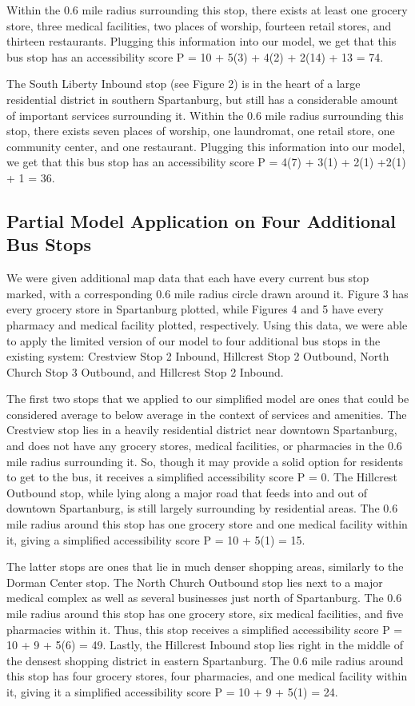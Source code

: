 Within the 0.6 mile radius surrounding this stop, there exists at least one grocery store, three medical facilities, two places of worship, fourteen retail stores, and thirteen restaurants. Plugging this information into our model, we get that this bus stop has an accessibility score P = 10 + 5(3) + 4(2) + 2(14) + 13 = 74. 

The South Liberty Inbound stop (see Figure 2) is in the heart of a large residential district in southern Spartanburg, but still has a considerable amount of important services surrounding it. Within the 0.6 mile radius surrounding this stop, there exists seven places of worship, one laundromat, one retail store, one community center, and one restaurant. Plugging this information into our model, we get that this bus stop has an accessibility score P = 4(7) + 3(1) + 2(1) +2(1) + 1 = 36.

\subsection{Partial Model Application on Four Additional Bus Stops}

We were given additional map data that each have every current bus stop marked, with a corresponding 0.6 mile radius circle drawn around it. Figure 3 has every grocery store in Spartanburg plotted, while Figures 4 and 5 have every pharmacy and medical facility plotted, respectively. Using this data, we were able to apply the limited version of our model to four additional bus stops in the existing system: Crestview Stop 2 Inbound, Hillcrest Stop 2 Outbound, North Church Stop 3 Outbound, and Hillcrest Stop 2 Inbound.

The first two stops that we applied to our simplified model are ones that could be considered average to below average in the context of services and amenities. The Crestview stop lies in a heavily residential district near downtown Spartanburg, and does not have any grocery stores, medical facilities, or pharmacies in the 0.6 mile radius surrounding it. So, though it may provide a solid option for residents to get to the bus, it receives a simplified accessibility score P = 0. The Hillcrest Outbound stop, while lying along a major road that feeds into and out of downtown Spartanburg, is still largely surrounding by residential areas. The 0.6 mile radius around this stop has one grocery store and one medical facility within it, giving a simplified accessibility score P = 10 + 5(1) = 15. 

The latter stops are ones that lie in much denser shopping areas, similarly to the Dorman Center stop. The North Church Outbound stop lies next to a major medical complex as well as several businesses just north of Spartanburg. The 0.6 mile radius around this stop has one grocery store, six medical facilities, and five pharmacies within it. Thus, this stop receives a simplified accessibility score P = 10 + 9 + 5(6) = 49. Lastly, the Hillcrest Inbound stop lies right in the middle of the densest shopping district in eastern Spartanburg. The 0.6 mile radius around this stop has four grocery stores, four pharmacies, and one medical facility within it, giving it a simplified accessibility score P = 10 + 9 + 5(1) = 24.


